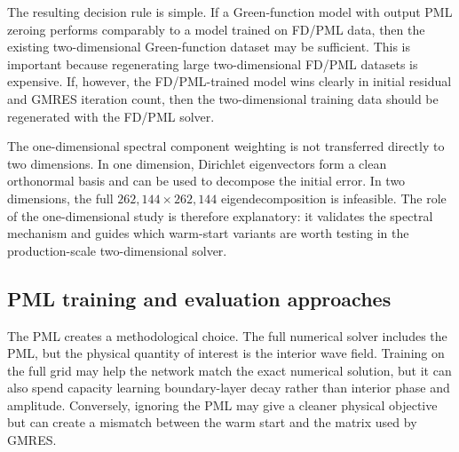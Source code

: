 The resulting decision rule is simple. If a Green-function model with output
PML zeroing performs comparably to a model trained on FD/PML data, then the
existing two-dimensional Green-function dataset may be sufficient. This is
important because regenerating large two-dimensional FD/PML datasets is
expensive. If, however, the FD/PML-trained model wins clearly in initial
residual and GMRES iteration count, then the two-dimensional training data
should be regenerated with the FD/PML solver.

The one-dimensional spectral component weighting is not transferred directly
to two dimensions. In one dimension, Dirichlet eigenvectors form a clean
orthonormal basis and can be used to decompose the initial error. In two
dimensions, the full $262{,}144 \times 262{,}144$ eigendecomposition is
infeasible. The role of the one-dimensional study is therefore explanatory:
it validates the spectral mechanism and guides which warm-start variants are
worth testing in the production-scale two-dimensional solver.


\subsection{PML training and evaluation approaches}
\label{subsec:methodology_2d_pml_approaches}

The PML creates a methodological choice. The full numerical solver includes
the PML, but the physical quantity of interest is the interior wave field.
Training on the full grid may help the network match the exact numerical
solution, but it can also spend capacity learning boundary-layer decay rather
than interior phase and amplitude. Conversely, ignoring the PML may give a
cleaner physical objective but can create a mismatch between the warm start
and the matrix used by GMRES.

